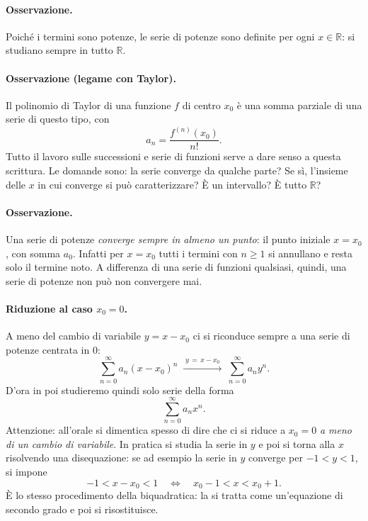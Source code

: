 \paragraph{Osservazione.} %
Poiché i termini sono potenze, le serie di potenze sono definite per ogni
$x\in\mathbb{R}$: si studiano sempre in tutto $\mathbb{R}$.

\paragraph{Osservazione (legame con Taylor).}
Il polinomio di Taylor di una funzione $f$ di centro $x_0$ è una somma parziale
di una serie di questo tipo, con
\[
  a_n=\frac{f^{(n)}(x_0)}{n!}.
\]
Tutto il lavoro sulle successioni e serie di funzioni serve a dare senso a
questa scrittura. Le domande sono: la serie converge da qualche parte? Se sì,
l'insieme delle $x$ in cui converge si può caratterizzare? È un intervallo? È
tutto $\mathbb{R}$?

\paragraph{Osservazione.} Una serie di potenze \emph{converge sempre in almeno un
punto}: il punto iniziale $x=x_0$, con somma $a_0$.
Infatti per $x=x_0$ tutti i termini con $n\ge1$ si annullano e resta solo il
termine noto. A differenza di una serie di funzioni qualsiasi, quindi, una serie
di potenze non può non convergere mai.

\paragraph{Riduzione al caso $x_0=0$.} A meno del cambio di variabile
$y=x-x_0$ ci si riconduce sempre a una serie di potenze centrata in $0$:
\[
  \sum_{n=0}^{\infty} a_n (x-x_0)^n \;\xrightarrow{\;y\,=\,x-x_0\;}\; \sum_{n=0}^{\infty} a_n y^n .
\]
D'ora in poi studieremo quindi solo serie della forma
\[
  \sum_{n=0}^{\infty} a_n x^n .
\]
Attenzione: all'orale si dimentica spesso di dire che ci si riduce a $x_0=0$
\emph{a meno di un cambio di variabile}.
In pratica si studia la serie in $y$ e poi si torna alla $x$ risolvendo una
disequazione: se ad esempio la serie in $y$ converge per $-1<y<1$, si impone
\[
  -1<x-x_0<1 \quad\Longleftrightarrow\quad x_0-1<x<x_0+1 .
\]
È lo stesso procedimento della biquadratica: la si tratta come un'equazione di
secondo grado e poi si risostituisce.

